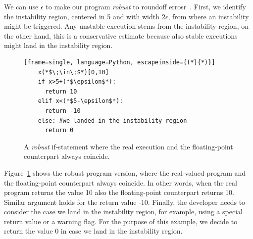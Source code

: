 We can use $\epsilon$ to make our program \emph{robust} to roundoff errosr~\cite{guardstable}.
%
First, we identify the instability region, centered in 5 and with width $2\epsilon$, from where an instability might be triggered.
%
Any unstable execution stems from the instability region, on the other hand, this is a conservative estimate because also stable executions might land in the instability region.
%
\begin{figure}[tb!]
	\begin{lstlisting}[frame=single, language=Python, escapeinside={(*}{*)}]
	x(*$\;\in\;$*)[0,10]
	if x>5+(*$\epsilon$*):
	  return 10
	elif x<(*$5-\epsilon$*):
	  return -10
	else: #we landed in the instability region
	  return 0
	\end{lstlisting}
	\caption{A \emph{robust} if-statement where the real execution and the floating-point counterpart always coincide.}
	\label{fig:ifrobust}
\end{figure}
%
Figure~\ref{fig:ifrobust} shows the robust program version, where the real-valued program and the floating-point counterpart always coincide. 
%
In other words, when the real program returns the value 10 also the floating-point counterpart returns 10. Similar argument holds for the return value -10.
%
Finally, the developer needs to consider the case we land in the instability region, for example, using a special return value or a warning flag.
%
For the purpose of this example, we decide to return the value $0$ in case we land in the instability region. 

%

